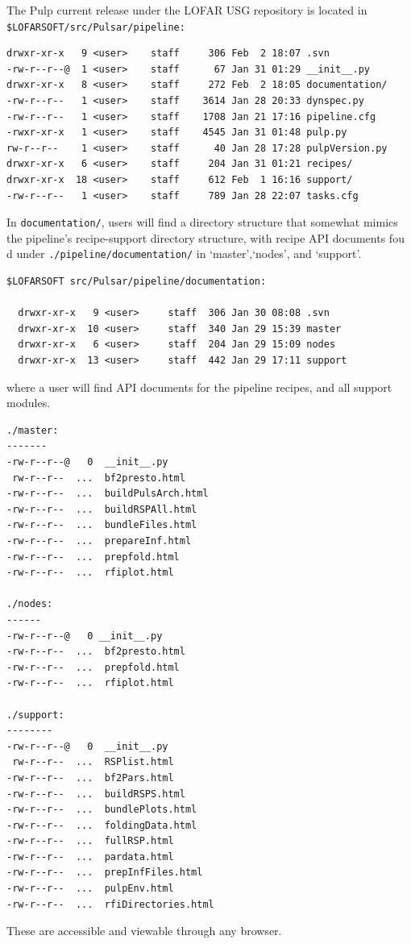 \documentclass[a4paper,10pt,bibtotoc]{scrartcl}
\begin{document}
The Pulp current release under the LOFAR USG repository is located in \\
\noindent \verb|$LOFARSOFT/src/Pulsar/pipeline:|
\begin{verbatim}
drwxr-xr-x   9 <user>    staff     306 Feb  2 18:07 .svn 
-rw-r--r--@  1 <user>    staff      67 Jan 31 01:29 __init__.py
drwxr-xr-x   8 <user>    staff     272 Feb  2 18:05 documentation/
-rw-r--r--   1 <user>    staff    3614 Jan 28 20:33 dynspec.py
-rw-r--r--   1 <user>    staff    1708 Jan 21 17:16 pipeline.cfg
-rwxr-xr-x   1 <user>    staff    4545 Jan 31 01:48 pulp.py
rw-r--r--    1 <user>    staff      40 Jan 28 17:28 pulpVersion.py
drwxr-xr-x   6 <user>    staff     204 Jan 31 01:21 recipes/
drwxr-xr-x  18 <user>    staff     612 Feb  1 16:16 support/
-rw-r--r--   1 <user>    staff     789 Jan 28 22:07 tasks.cfg
\end{verbatim}
In \verb|documentation/|, users will  find a directory structure that
somewhat mimics the pipeline's recipe-support directory structure, with
recipe API documents fou d under \verb|./pipeline/documentation/| in
`master',`nodes', and `support'.
\begin{verbatim}
$LOFARSOFT src/Pulsar/pipeline/documentation:

  drwxr-xr-x   9 <user>     staff  306 Jan 30 08:08 .svn
  drwxr-xr-x  10 <user>     staff  340 Jan 29 15:39 master
  drwxr-xr-x   6 <user>     staff  204 Jan 29 15:09 nodes
  drwxr-xr-x  13 <user>     staff  442 Jan 29 17:11 support
\end{verbatim}
where a user will find API documents for the pipeline recipes, and all support
modules.\\
\begin{verbatim}
./master:
-------
-rw-r--r--@   0  __init__.py
 rw-r--r--  ...  bf2presto.html
-rw-r--r--  ...  buildPulsArch.html
-rw-r--r--  ...  buildRSPAll.html
-rw-r--r--  ...  bundleFiles.html
-rw-r--r--  ...  prepareInf.html
-rw-r--r--  ...  prepfold.html
-rw-r--r--  ...  rfiplot.html

./nodes:
------
-rw-r--r--@   0 __init__.py
-rw-r--r--  ...  bf2presto.html
-rw-r--r--  ...  prepfold.html
-rw-r--r--  ...  rfiplot.html

./support:
--------
-rw-r--r--@   0  __init__.py
 rw-r--r--  ...  RSPlist.html
-rw-r--r--  ...  bf2Pars.html
-rw-r--r--  ...  buildRSPS.html
-rw-r--r--  ...  bundlePlots.html
-rw-r--r--  ...  foldingData.html
-rw-r--r--  ...  fullRSP.html
-rw-r--r--  ...  pardata.html
-rw-r--r--  ...  prepInfFiles.html
-rw-r--r--  ...  pulpEnv.html
-rw-r--r--  ...  rfiDirectories.html
\end{verbatim}
These are accessible and viewable through any browser.
\end{document}
